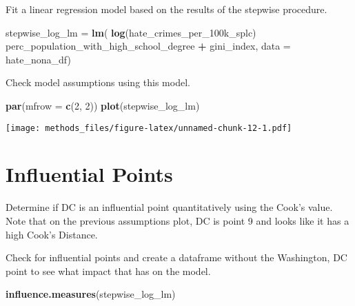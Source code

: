\documentclass[
]{article}
\newenvironment{Shaded}{\begin{snugshade}}{\end{snugshade}}
\newcommand{\DataTypeTok}[1]{\textcolor[rgb]{0.13,0.29,0.53}{#1}}
\newcommand{\DecValTok}[1]{\textcolor[rgb]{0.00,0.00,0.81}{#1}}
\newcommand{\KeywordTok}[1]{\textcolor[rgb]{0.13,0.29,0.53}{\textbf{#1}}}
\newcommand{\NormalTok}[1]{#1}
\newcommand{\OperatorTok}[1]{\textcolor[rgb]{0.81,0.36,0.00}{\textbf{#1}}}
\newcommand{\StringTok}[1]{\textcolor[rgb]{0.31,0.60,0.02}{#1}}
\begin{document}
Fit a linear regression model based on the results of the stepwise
procedure.

\begin{Shaded}
\begin{Highlighting}[]
\NormalTok{stepwise_log_lm =}\StringTok{ }\KeywordTok{lm}\NormalTok{(}
  \KeywordTok{log}\NormalTok{(hate_crimes_per_100k_splc)}
  \OperatorTok{~}\StringTok{ }\NormalTok{perc_population_with_high_school_degree }\OperatorTok{+}
\StringTok{    }\NormalTok{gini_index,}
  \DataTypeTok{data =}\NormalTok{ hate_nona_df)}
\end{Highlighting}
\end{Shaded}

Check model assumptions using this model.

\begin{Shaded}
\begin{Highlighting}[]
\KeywordTok{par}\NormalTok{(}\DataTypeTok{mfrow =} \KeywordTok{c}\NormalTok{(}\DecValTok{2}\NormalTok{, }\DecValTok{2}\NormalTok{))}
\KeywordTok{plot}\NormalTok{(stepwise_log_lm)}
\end{Highlighting}
\end{Shaded}

\texttt{[image: methods\_files/figure-latex/unnamed-chunk-12-1.pdf]}

\hypertarget{influential-points}{%
\section{Influential Points}\label{influential-points}}

Determine if DC is an influential point quantitatively using the Cook's
value. Note that on the previous assumptions plot, DC is point 9 and
looks like it has a high Cook's Distance.

Check for influential points and create a dataframe without the
Washington, DC point to see what impact that has on the model.

\begin{Shaded}
\begin{Highlighting}[]
\KeywordTok{influence.measures}\NormalTok{(stepwise_log_lm)}
\end{Highlighting}
\end{Shaded}
\end{document}
